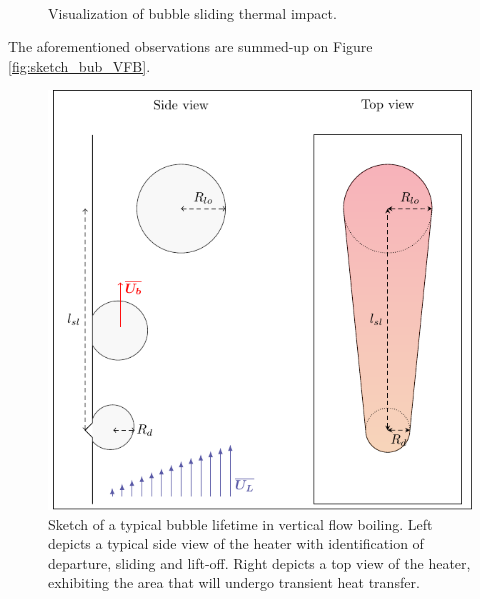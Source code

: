 \begin{figure}[h!]

\begin{center}
\\
\end{center}

\caption{Visualization of bubble sliding thermal impact.}
\label{fig:slide_thermal_exp}
\end{figure}


The aforementioned observations are summed-up on Figure \ref{fig:sketch_bub_VFB}. 

\begin{figure}
\centering
\includegraphics[width=0.65\linewidth]{img/forces/bub_life_VFB.pdf}
\caption{Sketch of a typical bubble lifetime in vertical flow boiling. Left depicts a typical side view of the heater with identification of departure, sliding and lift-off. Right depicts a top view of the heater, exhibiting the area that will undergo transient heat transfer.}
\label{fig:skecth_bub_VFB}
\end{figure}

